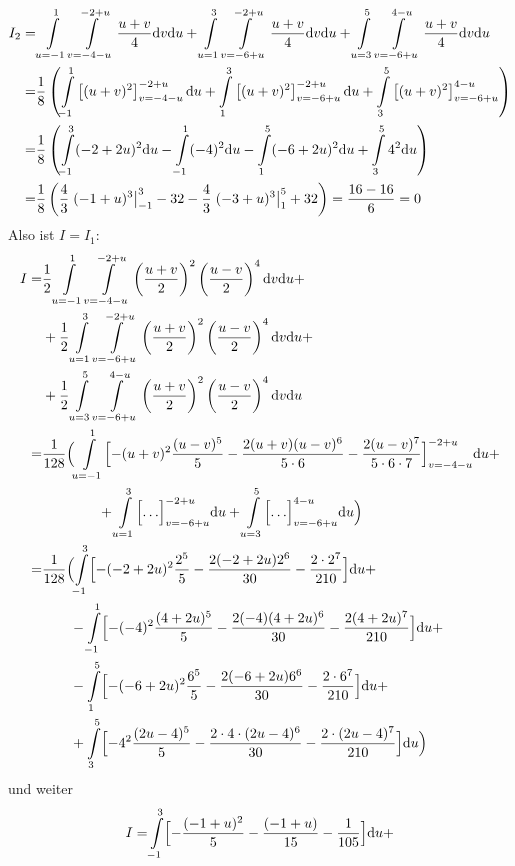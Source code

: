 {\begin{align*}
I_2=& \int\limits_{u=-1}^1\int\limits_{v=-4-u}^{-2+u} \frac {u+v}4 \mathrm{d} v  \mathrm{d} u
+ \int\limits_{u=1}^3\int\limits_{v=-6+u}^{-2+u} \frac{u+v}4 \mathrm{d} v \mathrm{d} u
+ \int\limits_{u=3}^5\int\limits_{v=-6+u}^{4-u}\frac{u+v}4 \mathrm{d} v \mathrm{d} u\\
=& \frac 18\left( \int\limits_{-1}^1 \left[(u+v)^2\right]_{v=-4-u}^{-2+u}\mathrm{d} u
+ \int\limits_{1}^3\left[(u+v)^2\right]_{v=-6+u}^{-2+u} \mathrm{d} u
+ \int\limits_{3}^5\left[(u+v)^2\right]_{v=-6+u}^{4-u}\right)\\
=& \frac 18 \left( \int\limits_{-1}^3(-2+2u)^2\mathrm{d} u - \int\limits_{-1}^1(-4)^2\mathrm{d} u
- \int\limits_{1}^5(-6+2u)^2\mathrm{d} u + \int\limits_{3}^54^2\mathrm{d} u\right)\\
=& \frac 1{8}\left( \frac 43\left.(-1+u)^3\right|_{-1}^3 - 32 - \frac
43 \left.(-3+u)^3\right|_{1}^5+32\right)=\frac{16-16  }{6}=0
\end{align*}
Also ist $I=I_1$: 
\begin{align*}
I=& \frac 12 \int\limits_{u=-1}^1\int\limits_{v=-4-u}^{-2+u} \left( \frac{u+v}2\right)^2 \left( \frac{u-v}2\right)^4
 \mathrm{d} v \mathrm{d} u +\\
&+ \frac 12\int\limits_{u=1}^3\int\limits_{v=-6+u}^{-2+u} \left( \frac{u+v}2\right)^2 \left( \frac{u-v}2\right)^4
 \mathrm{d} v \mathrm{d} u+\\
&+ \frac 12 \int\limits_{u=3}^5\int\limits_{v=-6+u}^{4-u} \left( \frac{u+v}2\right)^2 \left( \frac{u-v}2\right)^4
 \mathrm{d} v \mathrm{d} u\\
=& \frac 1{128}\Bigl(\int\limits_{u=-1}^1\Bigl[-(u+v)^2\frac{(u-v)^5}5
- \frac{2(u+v)(u-v)^6}{5\cdot 6} - \frac{2(u-v)^7}{5\cdot 6\cdot 7}\Bigr]_{v=-4-u}^{-2+u}\mathrm{d} u +\\
&\qquad\qquad +\int\limits_{u=1}^3\Bigl[\hdots\Bigr]_{v=-6+u}^{-2+u}\mathrm{d} u
+ \int\limits_{u=3}^5\Bigl[\hdots\Bigr]_{v=-6+u}^{4-u}\mathrm{d} u\Bigr)\\
=&\frac{1}{128}\Bigl( \int\limits_{-1}^3\Bigl[-(-2+2u)^2\frac{2^5}5-\frac{2(-2+2u)2^6}{30}-\frac{2\cdot
 2^7}{210}\Bigr]\mathrm{d} u+ \\
& \qquad - \int\limits_{-1}^1\Bigl[ -(-4)^2\frac{(4+2u)^5}5 - \frac{2(-4)(4+2u)^6}{30}-\frac{2(4+2u)^7}{210}\Bigr]\mathrm{d} u+\\
&\qquad -\int\limits_{1}^5\Bigl[ -(-6+2u)^2\frac{6^5}5
- \frac{2(-6+2u)6^6}{30}-\frac{2\cdot 6^7}{210}\Bigr]\mathrm{d} u+\\
&\qquad + \int\limits_{3}^5\Bigl[ -4^2\frac{(2u-4)^5}5-\frac{2\cdot 4 \cdot
 (2u-4)^6}{30}-\frac{2\cdot (2u-4)^7}{210}\Bigr]\mathrm{d} u\Bigr)
\end{align*}
und weiter
\begin{align*}
I=& \int\limits_{-1}^3\Bigl[-\frac{(-1+u)^2}5-\frac{(-1+u)}{15}-\frac{1}{105}\Bigr]\d u + \\

\end{align*}}
